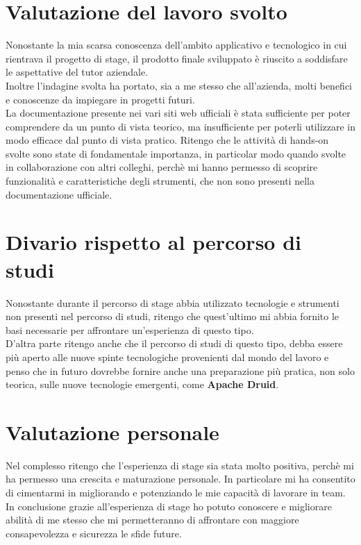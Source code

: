 \section{Valutazione del lavoro svolto}
Nonostante la mia scarsa conoscenza dell'ambito applicativo e tecnologico in cui rientrava il progetto di stage,
il prodotto finale sviluppato è riuscito a soddisfare le aspettative del tutor aziendale.\\
Inoltre l'indagine svolta 
ha portato, sia a me stesso che all'azienda,
 molti benefici e conoscenze da impiegare in progetti futuri.\\
La documentazione presente nei vari siti web ufficiali è stata sufficiente per poter comprendere 
da un punto di vista teorico, ma insufficiente 
per poterli utilizzare in modo efficace dal punto di vista pratico. Ritengo che 
le attività di \gls{hands-on}{} svolte sono state di fondamentale importanza, in particolar modo 
quando svolte in collaborazione con altri colleghi, perchè mi hanno permesso di 
scoprire funzionalità e caratteristiche degli strumenti, che non sono presenti nella documentazione ufficiale.\\
\section{Divario rispetto al percorso di studi}
Nonostante durante il percorso di stage abbia utilizzato tecnologie e strumenti non presenti nel percorso di studi,
ritengo che quest'ultimo mi abbia fornito le basi necessarie per affrontare un'esperienza di questo tipo.\\
D'altra parte ritengo anche che il percorso di studi di questo tipo, debba essere più aperto alle nuove spinte tecnologiche provenienti dal mondo del lavoro e penso che
in futuro dovrebbe fornire anche una preparazione più pratica, non solo teorica,
sulle nuove tecnologie emergenti, come \textbf{Apache Druid}.
\section{Valutazione personale}
Nel complesso ritengo che l'esperienza di stage sia stata molto positiva, perchè 
mi ha permesso una crescita e maturazione personale. In particolare mi ha consentito di cimentarmi in 
migliorando e potenziando le mie capacità di lavorare in team.\\
In conclusione grazie all'esperienza di stage ho potuto conoscere e migliorare abilità di me stesso
 che mi permetteranno di affrontare con maggiore consapevolezza e sicurezza le sfide future.\\
\newpage
\pagestyle{empty}
\null %
\newpage